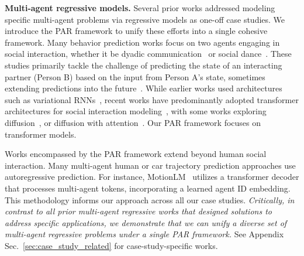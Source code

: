 \medskip
\noindent
\textbf{Multi-agent regressive models.} 
Several prior works addressed modeling specific multi-agent problems via regressive models as one-off case studies. We introduce the PAR framework to unify these efforts into a single cohesive framework. Many behavior prediction works focus on two agents engaging in social interaction, whether it be dyadic communication~\citep{Ng_2022_CVPR, ng2023text2listen, ng2024audio2photoreal} or social dance~\citep{siyao2024duolando,maluleke2024synergy}. These studies primarily tackle the challenge of predicting the state of an interacting partner (Person B) based on the input from Person A's state, sometimes extending predictions into the future~\citep{guo2022multi,maluleke2024synergy}. While earlier works used architectures such as variational RNNs~\citep{baruah2020multimodal}, recent works have predominantly adopted transformer architectures for social interaction modeling~\citep{guo2022multi,Ng_2022_CVPR, 10036100, ng2023text2listen, siyao2024duolando}, with some works exploring diffusion~\citep{liang2024intergen}, or diffusion with attention~\citep{ghosh2024remos}. Our PAR framework focuses on transformer models.

\medskip
Works encompassed by the PAR framework extend beyond human social interaction. Many multi-agent human or car trajectory prediction approaches use autoregressive prediction.  For instance, MotionLM~\citep{seff2023motionlm} utilizes a transformer decoder that processes multi-agent tokens, incorporating a learned agent ID embedding. This methodology informs our approach across all our case studies. \textit{Critically, in contrast to all prior multi-agent regressive works that designed solutions to address specific applications, we demonstrate that we can unify a diverse set of multi-agent regressive problems under a single PAR framework.} See Appendix Sec.~\ref{sec:case_study_related} for case-study-specific works.




